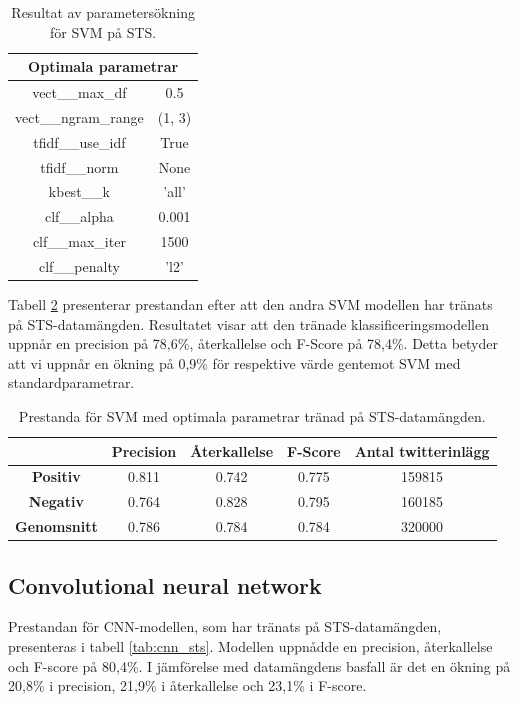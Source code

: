 \documentclass{kaumasters} %
\begin{document}
\begin{table}[H]
\centering
\caption{Resultat av parametersökning för SVM på STS.}
\label{tab:svm_grid_sts}
    \begin{tabular}{cc}
    \toprule
    \multicolumn{2}{c}{\textbf{Optimala parametrar}} \\
    \midrule
    vect\_\_max\_df & 0.5  \\
    vect\_\_ngram\_range & (1, 3)  \\
    tfidf\_\_use\_idf & True  \\
    tfidf\_\_norm & None  \\
    kbest\_\_k & 'all' \\
    clf\_\_alpha & 0.001 \\
    clf\_\_max\_iter & 1500 \\
    clf\_\_penalty & 'l2' \\
    \bottomrule
\end{tabular}
\end{table}

Tabell \ref{tab:svm_imp_sts} presenterar prestandan efter att den andra SVM modellen har tränats på STS-datamängden. Resultatet visar att den tränade klassificeringsmodellen uppnår en precision på 78,6\%, återkallelse och F-Score på 78,4\%. Detta betyder att vi uppnår en ökning på 0,9\% för respektive värde gentemot SVM med standardparametrar. 

\begin{table}[H]
\centering
\caption{Prestanda för SVM med optimala parametrar tränad på STS-datamängden.}
\label{tab:svm_imp_sts}
    \begin{tabular}{ccccc}
    \toprule
     & \textbf{Precision} & \textbf{Återkallelse} & \textbf{F-Score} & \textbf{Antal twitterinlägg}  \\
    \midrule
    \textbf{Positiv} & 0.811 & 0.742 & 0.775 & 159815 \\
    \textbf{Negativ} & 0.764 & 0.828 & 0.795 & 160185 \\
    \midrule
    \textbf{Genomsnitt} & 0.786 & 0.784 & 0.784  & 320000 \\
    \bottomrule
\end{tabular}
\end{table}


\subsection{Convolutional neural network}
Prestandan för CNN-modellen, som har tränats på STS-datamängden, presenteras i tabell \ref{tab:cnn_sts}. Modellen uppnådde en precision, återkallelse och F-score på 80,4\%. I jämförelse med datamängdens basfall är det en ökning på 20,8\% i precision, 21,9\% i återkallelse och 23,1\% i F-score.
\end{document}
